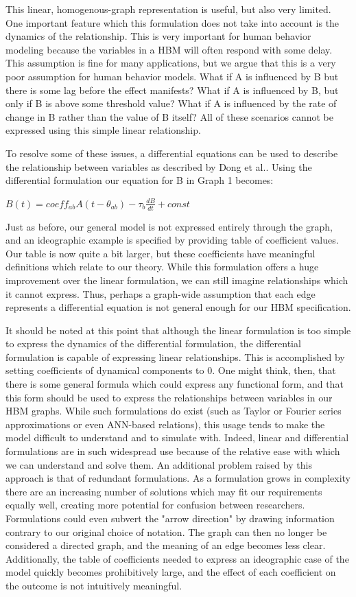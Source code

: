 \documentclass[conference]{IEEEtran}
\begin{document}
This linear, homogenous-graph representation is useful, but also very limited.
One important feature which this formulation does not take into account is the dynamics of the relationship.
This is very important for human behavior modeling because the variables in a HBM will often respond with some delay.
This assumption is fine for many applications, but we argue that this is a very poor assumption for human behavior models. What if A is influenced by B but there is some lag before the effect manifests?
What if A is influenced by B, but only if B is above some threshold value? What if A is influenced by the rate of change in B rather than the value of B itself? All of these scenarios cannot be expressed using this simple linear relationship. 

To resolve some of these issues, a differential equations can be used to describe the relationship between variables as described by Dong et al.\cite{dong2012dynamical}. 
Using the differential formulation our equation for B in Graph 1 becomes:

$B(t) = coeff_{ab}A(t-\theta_{ab}) - \tau_{b}\frac{dB}{dt} + const$

Just as before, our general model is not expressed entirely through the graph, and an ideographic example is specified by providing table of coefficient values.
Our table is now quite a bit larger, but these coefficients have meaningful definitions which relate to our theory.
While this formulation offers a huge improvement over the linear formulation, we can still imagine relationships which it cannot express.
Thus, perhaps a graph-wide assumption that each edge represents a differential equation is not general enough for our HBM specification. 

It should be noted at this point that although the linear formulation is too simple to express the dynamics of the differential formulation, the differential formulation is capable of expressing linear relationships.
This is accomplished by setting coefficients of dynamical components to 0.
One might think, then, that there is some general formula which could express any functional form, and that this form should be used to express the relationships between variables in our HBM graphs.
While such formulations do exist (such as Taylor or Fourier series approximations or even ANN-based relations), this usage tends to make the model difficult to understand and to simulate with.
Indeed, linear and differential formulations are in such widespread use because of the relative ease with which we can understand and solve them. An additional problem raised by this approach is that of redundant formulations.
As a formulation grows in complexity there are an increasing number of solutions which may fit our requirements equally well, creating more potential for confusion between researchers.
Formulations could even subvert the "arrow direction" by drawing information contrary to our original choice of notation.
The graph can then no longer be considered a directed graph, and the meaning of an edge becomes less clear.
Additionally, the table of coefficients needed to express an ideographic case of the model quickly becomes prohibitively large, and the effect of each coefficient on the outcome is not intuitively meaningful.
\end{document}
